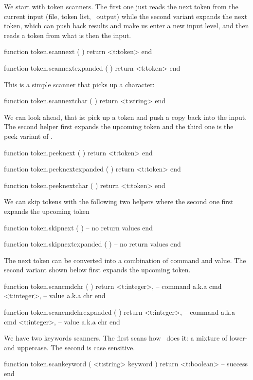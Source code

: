 We start with token scanners. The first one just reads the next token from the
current input (file, token list, \LUA\ output) while the second variant expands
the next token, which can push back results and make us enter a new input level,
and then reads a token from what is then the input.

\starttyping[option=LUA]
function token.scannext ( )
    return <t:token>
end

function token.scannextexpanded ( )
    return <t:token>
end
\stoptyping

This is a simple scanner that picks up a character:

\starttyping[option=LUA]
function token.scannextchar ( )
    return <t:string>
end
\stoptyping

We can look ahead, that is: pick up a token and push a copy back into the input.
The second helper first expands the upcoming token and the third one is the peek
variant of .

\starttyping[option=LUA]
function token.peeknext ( )
    return <t:token>
end

function token.peeknextexpanded ( )
    return <t:token>
end

function token.peeknextchar ( )
    return <t:token>
end
\stoptyping

We can skip tokens with the following two helpers where the second one first
expands the upcoming token

\starttyping[option=LUA]
function token.skipnext ( )
    -- no return values
end

function token.skipnextexpanded ( )
    -- no return values
end
\stoptyping

The next token can be converted into a combination of command and value. The
second variant shown below first expands the upcoming token.

\starttyping[option=LUA]
function token.scancmdchr ( )
    return
        <t:integer>, -- command a.k.a cmd
        <t:integer>, -- value   a.k.a chr
end

function token.scancmdchrexpanded ( )
    return
        <t:integer>, -- command a.k.a cmd
        <t:integer>, -- value   a.k.a chr
end
\stoptyping

We have two keywords scanners. The first scans how \TEX\ does it: a mixture of
lower- and uppercase. The second is case sensitive.

\starttyping[option=LUA]
function token.scankeyword ( <t:string> keyword )
    return <t:boolean> -- success
end


